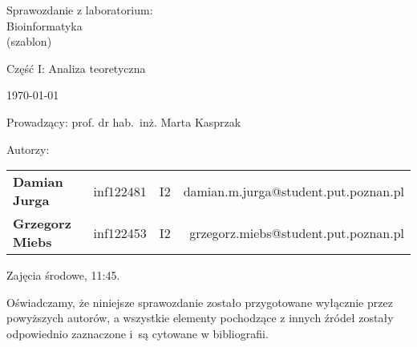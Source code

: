 \thispagestyle{empty} %

\begin{center}
{\large{Sprawozdanie z laboratorium:\\
Bioinformatyka\\
(szablon)}}

\vspace{3ex}

Część I: Analiza teoretyczna

\vspace{3ex}
{\footnotesize\today}

\end{center}


\vspace{10ex}

Prowadzący: prof. dr hab.~inż. Marta Kasprzak

\vspace{5ex}

Autorzy:
\begin{tabular}{lllr}
\textbf{Damian Jurga} & inf122481 & I2 & damian.m.jurga@student.put.poznan.pl \\
\textbf{Grzegorz Miebs} & inf122453 & I2 & grzegorz.miebs@student.put.poznan.pl \\
\end{tabular}

\vspace{5ex}

Zajęcia środowe, 11:45.

\vspace{35ex}

\noindent Oświadczamy, że niniejsze sprawozdanie zostało przygotowane wyłącznie przez powyższych autorów,
a wszystkie elementy pochodzące z innych źródeł zostały odpowiednio zaznaczone i~są cytowane w bibliografii.  

\newpage

